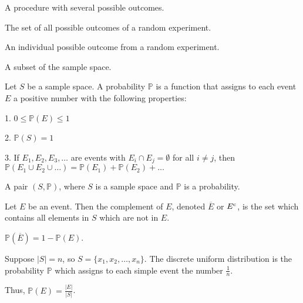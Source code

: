 \documentclass{article}
\begin{document}
\pagecolor{black}
\color{white}


    A procedure with several possible outcomes.

\medskip
{}

    The set of all possible outcomes of a random experiment.

\medskip
{}

    An individual possible outcome from a random experiment.

\medskip
{}
    
    A subset of the sample space.
    
\medskip
{}

    Let $S$ be a sample space. A probability $\mathbb P$ is a function that assigns to each event $E$ a positive number with the following properties:

\medskip
{}

    1. $0 \leq \mathbb P(E) \leq 1$
    
    2. $\mathbb P(S) = 1$
    
    3. If $E_1, E_2, E_3, \hdots$ are events with $E_i \cap E_j = \emptyset$ for all $i \neq j$, then \\
    $\mathbb P(E_1 \cup E_2 \cup \hdots) = \mathbb P(E_1) + \mathbb P(E_2) + \hdots$

\medskip
{}

    A pair $(S, \mathbb P)$, where $S$ is a sample space and $\mathbb P$ is a probability.

\medskip
{}

    Let $E$ be an event. Then the complement of $E$, denoted $\overline E$ or $E^\text c$, is the set which contains all elements in $S$ which are not in $E$.
    
    $\mathbb P(\overline E) = 1 - \mathbb P(E)$.

\medskip
{}

    Suppose $|S| = n$, so $S=\{x_1,x_2,\hdots,x_n\}$. The discrete uniform distribution is the probability $\mathbb P$ which assigns to each simple event the number $\frac{1}{n}$.

    Thus, $\mathbb P(E) = \frac{|E|}{|S|}$.

\medskip
{}
\end{document}
